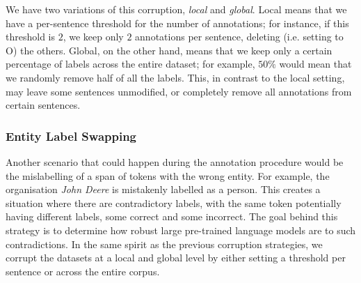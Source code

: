 \documentclass{article}
\begin{document}
We have two variations of this corruption, \textit{local} and \textit{global}. Local means that we have a per-sentence threshold for the number of annotations; for instance, if this threshold is $2$, we keep only $2$ annotations per sentence, deleting (i.e. setting to O) the others. Global, on the other hand, means that we keep only a certain percentage of labels across the entire dataset; for example, $50\%$ would mean that we randomly remove half of all the labels. This, in contrast to the local setting, may leave some sentences unmodified, or completely remove all annotations from certain sentences.


\subsubsection{Entity Label Swapping}
\label{sec:method:swapping}

Another scenario that could happen during the annotation procedure would be the mislabelling of a span of tokens with the wrong entity. For example, the organisation \textit{John Deere} is mistakenly labelled as a person. This creates a situation where there are contradictory labels, with the same token potentially having different labels, some correct and some incorrect. The goal behind this strategy is to determine how robust large pre-trained language models are to such contradictions. 
In the same spirit as the previous corruption strategies, we corrupt the datasets at a local and global level by either setting a threshold per sentence or across the entire corpus.


\end{document}
